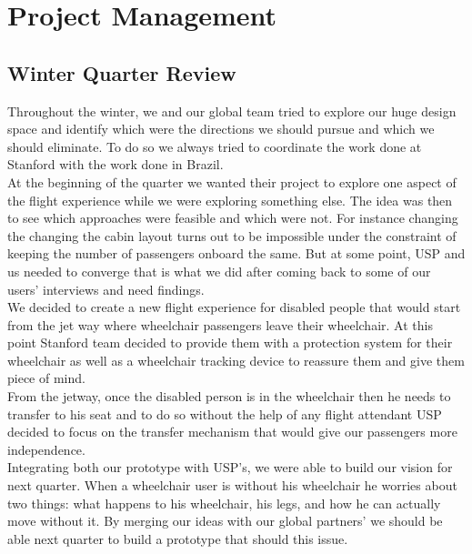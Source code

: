 \chapter{Project Management}
\label{Project_Management}

\section{Winter Quarter Review}
Throughout the winter, we and our global team tried to explore our huge design space and identify which were the directions we should pursue and which we should eliminate. To do so we always tried to coordinate the work done at Stanford with the work done in Brazil. \\

At the beginning of the quarter we wanted their project to explore one aspect of the flight experience while we were exploring something else. The idea was then to see which approaches were feasible and which were not. For instance changing the changing the cabin layout turns out to be impossible under the constraint of keeping the number of passengers onboard the same. But at some point, USP and us needed to converge that is what we did after coming back to some of our users’ interviews and need findings. \\

We decided to create a new flight experience for disabled people that would start from the jet way where wheelchair passengers leave their wheelchair. At this point Stanford team decided to provide them with a protection system for their wheelchair as well as a wheelchair tracking device to reassure them and give them piece of mind. \\

From the jetway, once the disabled person is in the wheelchair then he needs to transfer to his seat and to do so without the help of any flight attendant USP decided to focus on the transfer mechanism that would give our passengers more independence. \\

Integrating both our prototype with USP’s, we were able to build our vision for next quarter. When a wheelchair user is without his wheelchair he worries about two things: what happens to his wheelchair, his legs, and how he can actually move without it. By merging our ideas with our global partners’ we should be able next quarter to build a prototype that should this issue.


